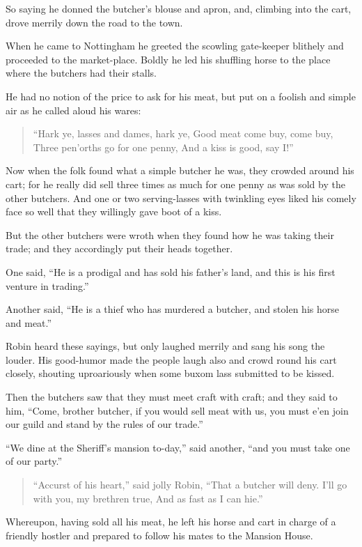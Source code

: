 So saying he donned the butcher's blouse and apron, and, climbing into
the cart, drove merrily down the road to the town.

When he came to Nottingham he greeted the scowling gate-keeper blithely
and proceeded to the market-place. Boldly he led his shuffling horse to
the place where the butchers had their stalls.

He had no notion of the price to ask for his meat, but put on a foolish
and simple air as he called aloud his wares:

\begin{quote}
“Hark ye, lasses and dames, hark ye,
Good meat come buy, come buy,
Three pen’orths go for one penny,
And a kiss is good, say I!”
\end{quote}

Now when the folk found what a simple butcher he was, they crowded
around his cart; for he really did sell three times as much for one
penny as was sold by the other butchers. And one or two serving-lasses
with twinkling eyes liked his comely face so well that they willingly
gave boot of a kiss.

But the other butchers were wroth when they found how he was taking
their trade; and they accordingly put their heads together.

One said, ``He is a prodigal and has sold his father's land, and this is
his first venture in trading.''

Another said, ``He is a thief who has murdered a butcher, and stolen his
horse and meat.''

Robin heard these sayings, but only laughed merrily and sang his song
the louder. His good-humor made the people laugh also and crowd round
his cart closely, shouting uproariously when some buxom lass submitted
to be kissed.

Then the butchers saw that they must meet craft with craft; and they
said to him, ``Come, brother butcher, if you would sell meat with us,
you must e'en join our guild and stand by the rules of our trade.''

``We dine at the Sheriff's mansion to-day,'' said another, ``and you
must take one of our party.''

\begin{quote}
“Accurst of his heart,” said jolly Robin,
“That a butcher will deny.
I’ll go with you, my brethren true,
And as fast as I can hie.”
\end{quote}

Whereupon, having sold all his meat, he left his horse and cart in
charge of a friendly hostler and prepared to follow his mates to the
Mansion House.

